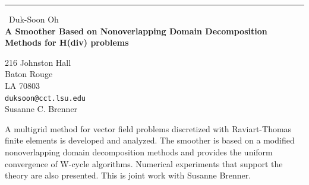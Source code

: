 \documentclass{report}
\begin{document}
\begin{center}
\rule{6in}{1pt} \
{\large Duk-Soon Oh \\
{\bf A Smoother Based on Nonoverlapping Domain Decomposition Methods for H(div) problems}}

216 Johnston Hall \\ Baton Rouge \\ LA 70803
\\
{\tt duksoon@cct.lsu.edu}\\
Susanne C. Brenner\end{center}

A multigrid method for vector field problems discretized with
Raviart-Thomas finite elements is developed and analyzed. The smoother is
based on a modified nonoverlapping domain decomposition methods and
provides the uniform convergence of W-cycle algorithms. Numerical
experiments that support the theory are also presented. This is joint
work with Susanne Brenner.
\end{document}
